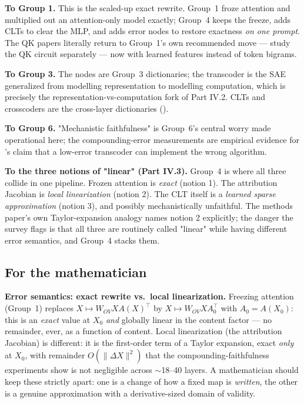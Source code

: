 \textbf{To Group 1.} This is the scaled-up exact rewrite. Group~1 froze attention and multiplied out an attention-only model exactly; Group~4 keeps the freeze, adds CLTs to clear the MLP, and adds error nodes to restore exactness \emph{on one prompt}. The QK papers literally return to Group~1's own recommended move --- study the QK circuit separately --- now with learned features instead of token bigrams.

\textbf{To Group 3.} The nodes are Group~3 dictionaries; the transcoder is the SAE generalized from modelling representation to modelling computation, which is precisely the representation-vs-computation fork of Part IV.2. CLTs and crosscoders are the cross-layer dictionaries (\textcite{sparse-crosscoders-model-diffing}).

\textbf{To Group 6.} "Mechanistic faithfulness" is Group~6's central worry made operational here; the compounding-error measurements are empirical evidence for \textcite{toy-model-of-mechanistic-unfaithfulness}'s claim that a low-error transcoder can implement the wrong algorithm.

\textbf{To the three notions of "linear" (Part IV.3).} Group~4 is where all three collide in one pipeline. Frozen attention is \emph{exact} (notion 1). The attribution Jacobian is \emph{local linearization} (notion 2). The CLT itself is a \emph{learned sparse approximation} (notion 3), and possibly mechanistically unfaithful. The methods paper's own Taylor-expansion analogy names notion 2 explicitly; the danger the survey flags is that all three are routinely called "linear" while having different error semantics, and Group~4 stacks them.

\subsection*{For the mathematician}

\textbf{Error semantics: exact rewrite vs.\ local linearization.} Freezing attention (Group~1) replaces $X\mapsto W_{OV}X A(X)^{\top}$ by $X\mapsto W_{OV}X A_0^{\top}$ with $A_0=A(X_0)$: this is an \emph{exact} value at $X_0$ \emph{and} globally linear in the content factor --- no remainder, ever, as a function of content. Local linearization (the attribution Jacobian) is different: it is the first-order term of a Taylor expansion, exact \emph{only} at $X_0$, with remainder $O(\lVert\Delta X\rVert^2)$ that the compounding-faithfulness experiments show is not negligible across $\sim$18--40 layers. A mathematician should keep these strictly apart: one is a change of how a fixed map is \emph{written}, the other is a genuine approximation with a derivative-sized domain of validity.

